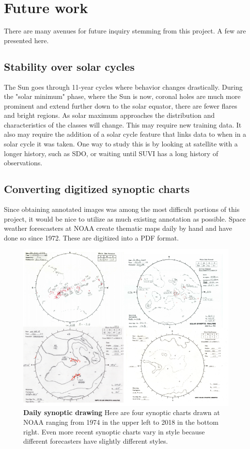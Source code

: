 \documentclass[twoside]{report}
\begin{document}
\section{Future work}
There are many avenues for future inquiry stemming from this project. A few are presented here. 

\subsection{Stability over solar cycles}
The Sun goes through 11-year cycles where behavior changes drastically. During the "solar minimum" phase, where the Sun is now, coronal holes are much more prominent and extend further down to the solar equator, there are fewer flares and bright regions. As solar maximum approaches the distribution and characteristics of the classes will change. This may require new training data. It also may require the addition of a solar cycle feature that links data to when in a solar cycle it was taken. One way to study this is by looking at satellite with a longer history, such as SDO, or waiting until SUVI has a long history of observations. 

\subsection{Converting digitized synoptic charts}
Since obtaining annotated images was among the most difficult portions of this project, it would be nice to utilize as much existing annotation as possible. Space weather forescasters at NOAA create thematic maps daily by hand and have done so since 1972. These are digitized into a PDF format. 

\begin{figure}[ht]
  \begin{center}
    \includegraphics[scale=0.8]{synoptic}
    \caption{{\bf Daily synoptic drawing} Here are four synoptic charts drawn at NOAA ranging from 1974 in the upper left to 2018 in the bottom right. Even more recent synoptic charts vary in style because different forecasters have slightly different styles.}
    \label{fig:synoptic}
 \end{center}
\end{figure}
\end{document}
